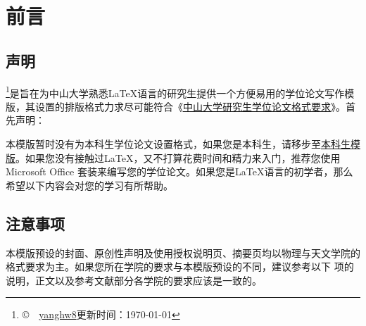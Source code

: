 \chapter{前\hspace*{1\ccwd}言}

\section{声明}

\sysuthesis{}\footnote{\copyright~\number\year~\href{https://github.com/yanghw8}{yanghw8}\hspace*{2\ccwd}更新时间：\today}是旨在为中山大学熟悉\LaTeX{}语言的研究生提供一个方便易用的学位论文写作模版，其设置的排版格式力求尽可能符合《\href{https://graduate.sysu.edu.cn/sites/graduate.prod.dpcms4.sysu.edu.cn/files/2019-04/%E4%B8%AD%E5%B1%B1%E5%A4%A7%E5%AD%A6%E7%A0%94%E7%A9%B6%E7%94%9F%E5%AD%A6%E4%BD%8D%E8%AE%BA%E6%96%87%E6%A0%BC%E5%BC%8F%E8%A6%81%E6%B1%82.pdf}{中山大学研究生学位论文格式要求}》。首先声明：

本模版暂时没有为本科生学位论文设置格式，如果您是本科生，请移步至\href{https://github.com/SYSU-SCC/sysu-thesis}{本科生模版}。如果您没有接触过\LaTeX{}，又不打算花费时间和精力来入门，推荐您使用 Microsoft Office 套装来编写您的学位论文。如果您是\LaTeX{}语言的初学者，那么希望以下内容会对您的学习有所帮助。

\section{注意事项}

本模版预设的封面、原创性声明及使用授权说明页、摘要页均以物理与天文学院的格式要求为主。如果您所在学院的要求与本模版预设的不同，建议参考以下 \textdagger 项的说明，正文以及参考文献部分各学院的要求应该是一致的。

